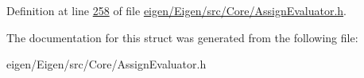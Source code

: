 Definition at line \hyperlink{eigen_2_eigen_2src_2_core_2_assign_evaluator_8h_source_l00258}{258} of file \hyperlink{eigen_2_eigen_2src_2_core_2_assign_evaluator_8h_source}{eigen/\+Eigen/src/\+Core/\+Assign\+Evaluator.\+h}.



The documentation for this struct was generated from the following file\+:\begin{DoxyCompactItemize}
\item 
eigen/\+Eigen/src/\+Core/\+Assign\+Evaluator.\+h\end{DoxyCompactItemize}
